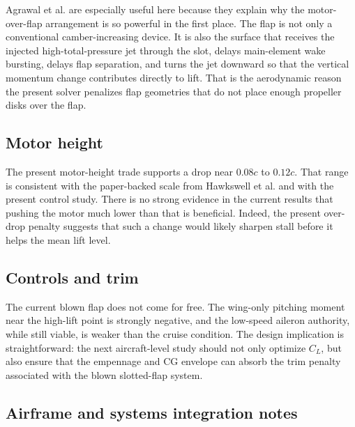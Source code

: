 \documentclass[conf]{new-aiaa}
\begin{document}
Agrawal et al. are especially useful here because they explain why the motor-over-flap arrangement is so powerful in the first place.\cite{Agrawal2019} The flap is not only a conventional camber-increasing device. It is also the surface that receives the injected high-total-pressure jet through the slot, delays main-element wake bursting, delays flap separation, and turns the jet downward so that the vertical momentum change contributes directly to lift. That is the aerodynamic reason the present solver penalizes flap geometries that do not place enough propeller disks over the flap.

\subsection{Motor height}

The present motor-height trade supports a drop near \(0.08c\) to \(0.12c\). That range is consistent with the paper-backed scale from Hawkswell et al. and with the present control study. There is no strong evidence in the current results that pushing the motor much lower than that is beneficial. Indeed, the present over-drop penalty suggests that such a change would likely sharpen stall before it helps the mean lift level.

\subsection{Controls and trim}

The current blown flap does not come for free. The wing-only pitching moment near the high-lift point is strongly negative, and the low-speed aileron authority, while still viable, is weaker than the cruise condition. The design implication is straightforward: the next aircraft-level study should not only optimize \(C_L\), but also ensure that the empennage and CG envelope can absorb the trim penalty associated with the blown slotted-flap system.

\subsection{Airframe and systems integration notes}
\end{document}
